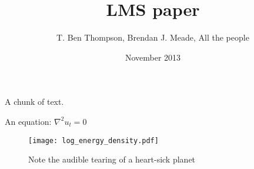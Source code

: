 \documentclass{article}
\title{LMS paper}
\author{T. Ben Thompson, Brendan J. Meade, All the people}
\date{November 2013}
\begin{document}
\maketitle

A chunk of text.

An equation:
$\nabla^2 u_t = 0$

\begin{figure}[h!]
  \centering
     \texttt{[image: log\_energy\_density.pdf]}
   \caption{Note the audible tearing of a heart-sick planet}
\end{figure}
\end{document}
